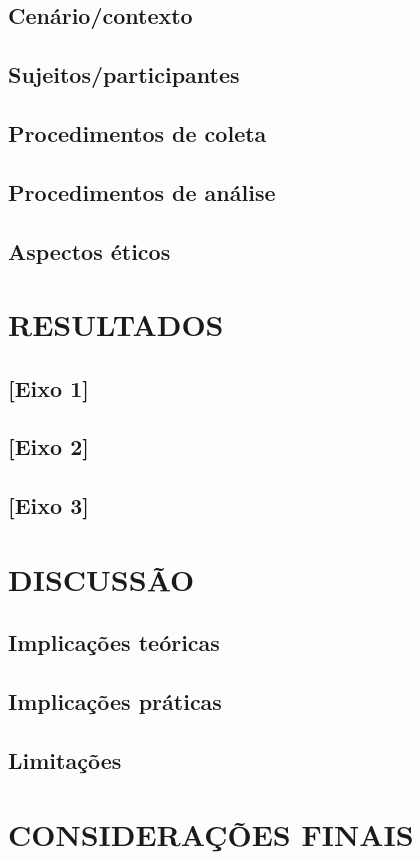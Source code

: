 \documentclass[
    12pt,
    openright,
    twoside,
    a4paper,
    chapter=TITLE,
    sumario=tradicional,
    section=TITLE,
    english,
    brazil
]{abntex2}
\begin{document}
\section{Cenário/contexto}
\section{Sujeitos/participantes}
\section{Procedimentos de coleta}
\section{Procedimentos de análise}
\section{Aspectos éticos}

\chapter{RESULTADOS}
\section{[Eixo 1]}
\section{[Eixo 2]}
\section{[Eixo 3]}

\chapter{DISCUSSÃO}
\section{Implicações teóricas}
\section{Implicações práticas}
\section{Limitações}

\chapter{CONSIDERAÇÕES FINAIS}
\end{document}

